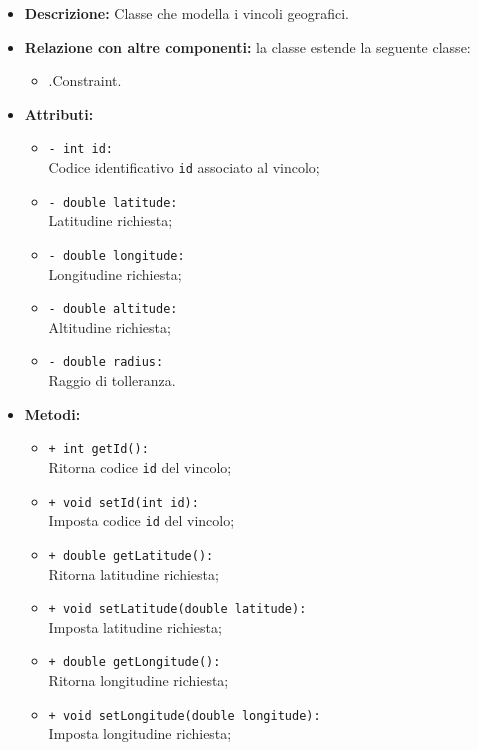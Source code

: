 \begin{flushleft}
\begin{itemize}
\item \textbf{Descrizione:} Classe che modella i vincoli geografici.
\item \textbf{Relazione con altre componenti:} la classe estende la seguente classe:
		\begin{itemize}
			\item \smodel{}.Constraint.
		\end{itemize}
\item \textbf{Attributi:}
\begin{sloppypar}
\begin{itemize}
\item \texttt{- int id:}\\ Codice identificativo \texttt{id} associato al vincolo;
\item \texttt{- double latitude:}\\ Latitudine richiesta;
\item \texttt{- double longitude:}\\ Longitudine richiesta;
\item \texttt{- double altitude:}\\ Altitudine richiesta;
\item \texttt{- double radius:}\\ Raggio di tolleranza.
\end{itemize}
\end{sloppypar}
\item \textbf{Metodi:}
\begin{sloppypar}
\begin{itemize}
\item \texttt{+ int getId():}\\ Ritorna codice \texttt{id} del vincolo;
\item \texttt{+ void setId(int id):}\\ Imposta codice \texttt{id} del vincolo;
\item \texttt{+ double getLatitude():}\\ Ritorna latitudine richiesta;
\item \texttt{+ void setLatitude(double latitude):}\\ Imposta latitudine richiesta;
\item \texttt{+ double getLongitude():}\\ Ritorna longitudine richiesta;
\item \texttt{+ void setLongitude(double longitude):}\\ Imposta longitudine richiesta;

\end{itemize}
\end{sloppypar}
\end{itemize}
\end{flushleft}
